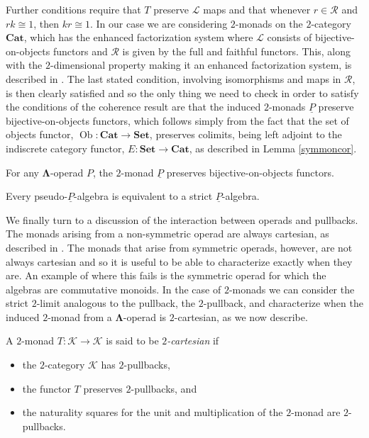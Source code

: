 \documentclass{amsbook} %
\newcommand{\mb}{\mathbf}
\newcommand{\m}[1]{\mathcal{#1}}
\newcommand{\ML}{\mathbf{\Lambda}}
\newcommand{\ob}{\operatorname{Ob}}
\numberwithin{section}{chapter}
\begin{document}
Further conditions require that $T$ preserve $\mathcal{L}$ maps and that whenever $r \in \mathcal{R}$ and $rk \cong 1$, then $kr \cong 1$. In our case we are considering $2$-monads on the $2$-category $\mathbf{Cat}$, which has the enhanced factorization system where $\m{L}$ consists of bijective-on-objects functors and $\m{R}$ is given by the full and faithful functors. This, along with the $2$-dimensional property making it an enhanced factorization system, is described in \cite{power-gen}. The last stated condition, involving isomorphisms and maps in $\m{R}$, is then clearly satisfied and so the only thing we need to check in order to satisfy the conditions of the coherence result are that the induced $2$-monads $\underline{P}$ preserve bijective-on-objects functors, which follows simply from the fact that the set of objects functor, $\ob \colon \mb{Cat} \rightarrow \mb{Set}$, preserves colimits, being left adjoint to the indiscrete category functor, $E \colon \mb{Set} \rightarrow \mb{Cat}$, as described in Lemma \ref{symmoncor}.

\begin{prop}
For any $\ML$-operad $P$, the $2$-monad $\underline{P}$ preserves bijective-on-objects functors.
\end{prop}
\begin{cor}
Every pseudo-$\underline{P}$-algebra is equivalent to a strict $\underline{P}$-algebra.
\end{cor}



We finally turn to a discussion of the interaction between operads and pullbacks.  The monads arising from a non-symmetric operad are always cartesian, as described in \cite{leinster}. The monads that arise from symmetric operads, however, are not always cartesian and so it is useful to be able to characterize exactly when they are. An example of where this fails is the symmetric operad for which the algebras are commutative monoids. In the case of $2$-monads we can consider the  strict $2$-limit analogous to the pullback, the $2$-pullback, and characterize when the induced $2$-monad from a $\ML$-operad is $2$-cartesian, as we now describe.

\begin{Defi}
A $2$-monad $T \colon \mathcal{K} \rightarrow \mathcal{K}$ is said to be \textit{$2$-cartesian} if
    \begin{itemize}
        \item the $2$-category $\mathcal{K}$ has $2$-pullbacks,
        \item the functor $T$ preserves $2$-pullbacks, and
        \item the naturality squares for the unit and multiplication of the $2$-monad are $2$-pullbacks.
    \end{itemize}
\end{Defi}
\end{document}
